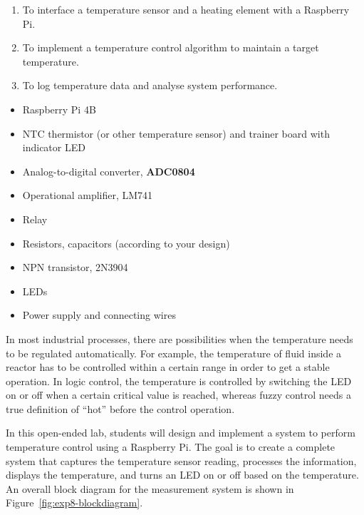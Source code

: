 
\begin{objectives}
  \begin{enumerate}
    \item To interface a temperature sensor and a heating element with a Raspberry Pi.
    \item To implement a temperature control algorithm to maintain a target temperature.
    \item To log temperature data and analyse system performance.
  \end{enumerate}
\end{objectives}

\begin{equipment}
  \begin{itemize}
    \item Raspberry Pi 4B
    \item NTC thermistor (or other temperature sensor) and trainer board with indicator LED
    \item Analog-to-digital converter, \textbf{ADC0804}
    \item Operational amplifier, LM741
    \item Relay
    \item Resistors, capacitors (according to your design)
    \item NPN transistor, 2N3904
    \item LEDs
    \item Power supply and connecting wires
  \end{itemize}
\end{equipment}

\begin{introduction}
  In most industrial processes, there are possibilities when the temperature needs to be regulated automatically. For example, the temperature of fluid inside a reactor has to be controlled within a certain range in order to get a stable operation. In logic control, the temperature is controlled by switching the LED on or off when a certain critical value is reached, whereas fuzzy control needs a true definition of ``hot'' before the control operation.
  \vspace*{1.5em}

  In this open-ended lab, students will design and implement a system to perform temperature control using a Raspberry Pi. The goal is to create a complete system that captures the temperature sensor reading, processes the information, displays the temperature, and turns an LED on or off based on the temperature.\newpage
  An overall block diagram for the measurement system is shown in Figure~\ref{fig:exp8-blockdiagram}.
  \vspace*{1.5em}
\end{introduction}

